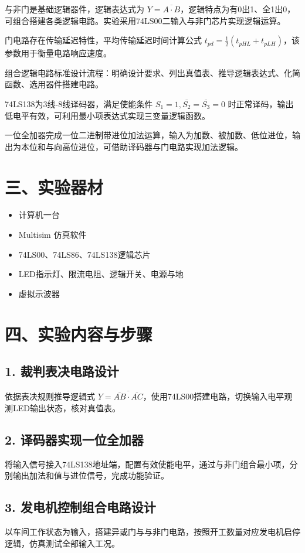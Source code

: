 \documentclass[12pt,a4paper]{article}
\begin{document}
与非门是基础逻辑器件，逻辑表达式为 $Y=\overline{A\cdot B}$，逻辑特点为有0出1、全1出0，可组合搭建各类逻辑电路。实验采用74LS00二输入与非门芯片实现逻辑运算。

门电路存在传输延迟特性，平均传输延迟时间计算公式 $t_{pd}=\frac{1}{2}(t_{pHL}+t_{pLH})$，该参数用于衡量电路响应速度。

组合逻辑电路标准设计流程：明确设计要求、列出真值表、推导逻辑表达式、化简函数、选用器件搭建电路。

74LS138为3线-8线译码器，满足使能条件 $S_1=1,\overline{S_2}=\overline{S_3}=0$ 时正常译码，输出低电平有效，可利用最小项表达式实现三变量逻辑函数。

一位全加器完成一位二进制带进位加法运算，输入为加数、被加数、低位进位，输出为本位和与向高位进位，可借助译码器与门电路实现加法逻辑。

\section{三、实验器材}
\begin{itemize}[itemsep=2pt]
    \item 计算机一台
    \item Multisim 仿真软件
    \item 74LS00、74LS86、74LS138逻辑芯片
    \item LED指示灯、限流电阻、逻辑开关、电源与地
    \item 虚拟示波器
\end{itemize}

\section{四、实验内容与步骤}
\subsection{1. 裁判表决电路设计}
依据表决规则推导逻辑式 $Y=\overline{\overline{AB}\cdot\overline{AC}}$，使用74LS00搭建电路，切换输入电平观测LED输出状态，核对真值表。

\subsection{2. 译码器实现一位全加器}
将输入信号接入74LS138地址端，配置有效使能电平，通过与非门组合最小项，分别输出加法和值与进位信号，完成功能验证。

\subsection{3. 发电机控制组合电路设计}
以车间工作状态为输入，搭建异或门与与非门电路，按照开工数量对应发电机启停逻辑，仿真测试全部输入工况。
\end{document}
